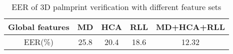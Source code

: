 \begin{table}[htbp]
\centering
\caption{EER of 3D palmprint verification with different feature sets}
\begin{tabular}{|c|c|c|c|c|}
\hline
Global features & MD    & HCA   & RLL   & MD+HCA+RLL \\
\hline
EER(\%) & 25.8  & 20.4  & 18.6  & 12.32 \\
\hline
\end{tabular}%
\label{tab:experiment:verification}%
\end{table}%
